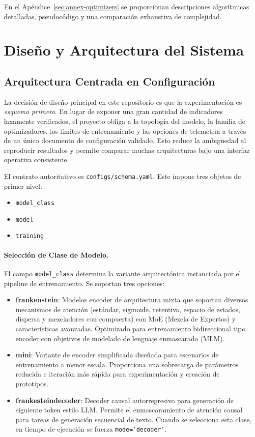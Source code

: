 \documentclass[11pt,a4paper]{article}
\begin{document}
En el Apéndice~\ref{sec:annex-optimizers} se proporcionan descripciones algorítmicas detalladas, pseudocódigo y una comparación exhaustiva de complejidad.

\section{Diseño y Arquitectura del Sistema}
\label{sec:system-design}

\subsection{Arquitectura Centrada en Configuración}
\label{sec:config-centric-architecture}

La decisión de diseño principal en este repositorio es que la experimentación es \emph{esquema primero}. En lugar de exponer una gran cantidad de indicadores laxamente verificados, el proyecto obliga a la topología del modelo, la familia de optimizadores, los límites de entrenamiento y las opciones de telemetría a través de un único documento de configuración validado. Esto reduce la ambigüedad al reproducir resultados y permite comparar muchas arquitecturas bajo una interfaz operativa consistente.

El contrato autoritativo es \texttt{configs/schema.yaml}. Este impone tres objetos de primer nivel:
\begin{itemize}[leftmargin=*]
    \item \texttt{model\_class}
    \item \texttt{model}
    \item \texttt{training}
\end{itemize}

\paragraph{Selección de Clase de Modelo.}
El campo \texttt{model\_class} determina la variante arquitectónica instanciada por el pipeline de entrenamiento. Se soportan tres opciones:
\begin{itemize}[leftmargin=*]
    \item \textbf{frankenstein}: Modelos encoder de arquitectura mixta que soportan diversos mecanismos de atención (estándar, sigmoide, retentiva, espacio de estados, dispersa y mezcladores con compuerta) con MoE (Mezcla de Expertos) y características avanzadas. Optimizado para entrenamiento bidireccional tipo encoder con objetivos de modelado de lenguaje enmascarado (MLM).
    \item \textbf{mini}: Variante de encoder simplificada diseñada para escenarios de entrenamiento a menor escala. Proporciona una sobrecarga de parámetros reducida e iteración más rápida para experimentación y creación de prototipos.
    \item \textbf{frankesteindecoder}: Decoder causal autorregresivo para generación de siguiente token estilo LLM. Permite el enmascaramiento de atención causal para tareas de generación secuencial de texto. Cuando se selecciona esta clase, en tiempo de ejecución se fuerza \texttt{mode='decoder'}.
\end{itemize}
\end{document}
